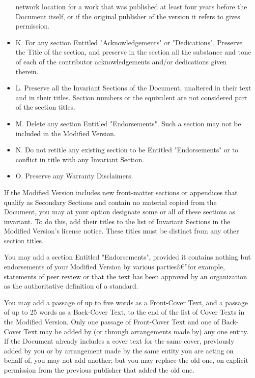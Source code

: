 \begin{itemize}
  network location for a work that was published at least four years
  before the Document itself, or if the original publisher of the
  version it refers to gives permission.
\item
  K. For any section Entitled "Acknowledgements" or "Dedications",
  Preserve the Title of the section, and preserve in the section all the
  substance and tone of each of the contributor acknowledgements and/or
  dedications given therein.
\item
  L. Preserve all the Invariant Sections of the Document, unaltered in
  their text and in their titles. Section numbers or the equivalent are
  not considered part of the section titles.
\item
  M. Delete any section Entitled "Endorsements". Such a section may not
  be included in the Modified Version.
\item
  N. Do not retitle any existing section to be Entitled "Endorsements"
  or to conflict in title with any Invariant Section.
\item
  O. Preserve any Warranty Disclaimers.
\end{itemize}

If the Modified Version includes new front-matter sections or appendices
that qualify as Secondary Sections and contain no material copied from
the Document, you may at your option designate some or all of these
sections as invariant. To do this, add their titles to the list of
Invariant Sections in the Modified Version's license notice. These
titles must be distinct from any other section titles.

You may add a section Entitled "Endorsements", provided it contains
nothing but endorsements of your Modified Version by various
partiesâ€''for example, statements of peer review or that the text has
been approved by an organization as the authoritative definition of a
standard.

You may add a passage of up to five words as a Front-Cover Text, and a
passage of up to 25 words as a Back-Cover Text, to the end of the list
of Cover Texts in the Modified Version. Only one passage of Front-Cover
Text and one of Back-Cover Text may be added by (or through arrangements
made by) any one entity. If the Document already includes a cover text
for the same cover, previously added by you or by arrangement made by
the same entity you are acting on behalf of, you may not add another;
but you may replace the old one, on explicit permission from the
previous publisher that added the old one.

